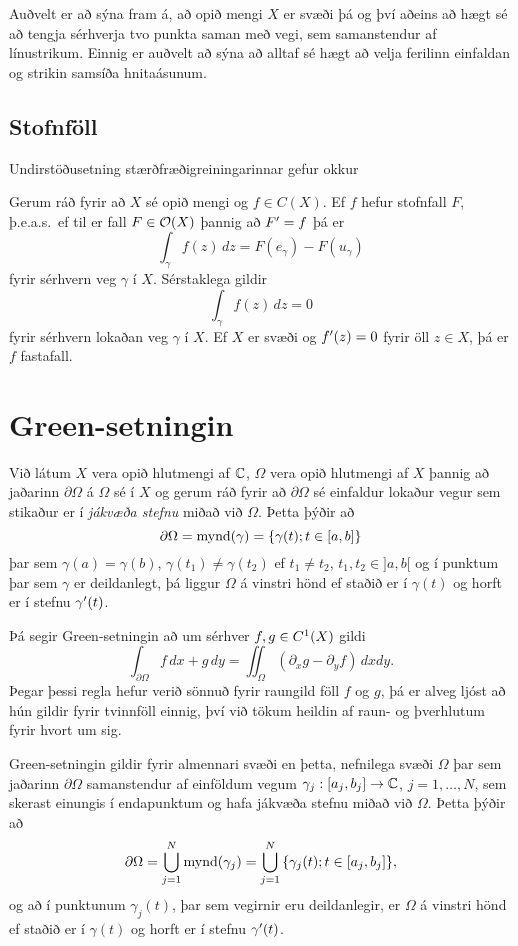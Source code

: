 Auðvelt er að sýna fram á, að opið mengi $X$ er svæði þá og því aðeins að
hægt sé að tengja sérhverja tvo punkta saman með vegi, sem samanstendur
af línustrikum. Einnig er auðvelt að sýna að alltaf sé hægt að velja ferilinn
einfaldan og strikin samsíða hnitaásunum. 

\subsection*{Stofnföll}

Undirstöðusetning stærðfræðigreiningarinnar gefur okkur

\begin{se} \label{se:10.1.3} Gerum ráð fyrir að $X$ sé opið mengi og $f\in C(X)$. Ef $f$ hefur
stofnfall $F$, þ.e.a.s.~ef til er fall $F\in {\cal O}(X)$
þannig að
$F{\sp{\prime}}=f$ þá er
 $$\int_\gamma f(z)\, dz = F(e_\gamma)-F(u_\gamma)
 $$
fyrir sérhvern veg $\gamma$ í $X$.  Sérstaklega gildir
 $$\int_\gamma f(z)\, dz = 0
 $$
fyrir sérhvern lokaðan veg $\gamma$ í $X$.  Ef $X$ er svæði og 
$f{\sp{\prime}}(z)=0$ fyrir öll $z\in X$, þá er $f$ fastafall.
\end{se}


\section{Green-setningin}

Við látum $X$ vera opið hlutmengi af ${\mathbb C}$, $\Omega$ vera opið hlutmengi
af $X$ þannig að jaðarinn $\partial\Omega$ á $\Omega$ sé í $X$ og gerum
ráð fyrir  að $\partial\Omega$  sé einfaldur lokaður vegur sem stikaður
er í {\it jákvæða stefnu} miðað við $\Omega$.
Þetta þýðir að 
$$ \partial\Omega={{\operatorname{mynd}(\gamma)}}={\{\gamma(t); t\in [a,b]\}} $$
þar sem $\gamma(a)=\gamma(b)$, $\gamma(t_1)\neq \gamma(t_2)$ ef
$t_1\neq t_2$, $t_1,t_2\in ]a,b[$ og í punktum þar sem $\gamma$ er
deildanlegt, þá liggur $\Omega$ á vinstri hönd ef staðið er í 
$\gamma(t)$  og horft er í stefnu $\gamma{\sp{\prime}}(t)$.


\noindent Þá segir Green-setningin að um sérhver $f,g\in C\sp 1(X)$ gildi
 $$\int_{\partial\Omega} f\, dx +g \, dy =\iint_\Omega(\partial_x
g-\partial_y f)\, dxdy.
 $$
Þegar þessi regla hefur verið sönnuð fyrir raungild föll $f$ og $g$,
þá er alveg ljóst að hún gildir fyrir tvinnföll einnig, því við tökum
heildin af raun- og þverhlutum fyrir hvort um sig.

Green-setningin  gildir fyrir almennari svæði en þetta, nefnilega svæði
$\Omega$ þar sem jaðarinn $\partial\Omega$ samanstendur af einföldum
vegum $\gamma_j:[a_j,b_j]\to {\mathbb C}$, $j=1,\dots,N$, 
sem skerast einungis í endapunktum og
hafa jákvæða stefnu miðað við $\Omega$.  Þetta þýðir að 
 $$\partial\Omega=\bigcup\limits_{j=1}^N\operatorname{mynd} (\gamma_j)=
\bigcup\limits_{j=1}^N {\{\gamma_j(t); t\in [a_j,b_j]\}},
 $$
og að í punktunum $\gamma_j(t)$, þar sem vegirnir eru deildanlegir, er
$\Omega$ á vinstri hönd ef staðið er í 
$\gamma(t)$  og horft er í stefnu $\gamma{\sp{\prime}}(t)$.

